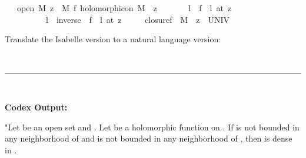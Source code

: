 \documentclass{article}
\begin{document}
\begin{boxB}
\begin{isabelle}
\isamarkupfalse \isanewline
\ \ \ {\isachardoublequoteopen}open\ M{\isachardoublequoteclose}\ {\isachardoublequoteopen}z\ {\isasymin}\ M{\isachardoublequoteclose}\ {\isachardoublequoteopen}f\ holomorphic{\isacharunderscore}{\kern0pt}on\ {\isacharparenleft}{\kern0pt}M\ {\isacharminus}{\kern0pt}\ {\isacharbraceleft}{\kern0pt}z{\isacharbraceright}{\kern0pt}{\isacharparenright}{\kern0pt}{\isachardoublequoteclose}\isanewline
\ \ \ \ \ \ \ {\isachardoublequoteopen}{\isasymAnd}l{\isachardot}{\kern0pt}\ {\isasymnot}\ {\isacharparenleft}{\kern0pt}f\ {\isasymlonglongrightarrow}\ l{\isacharparenright}{\kern0pt}\ {\isacharparenleft}{\kern0pt}at\ z{\isacharparenright}{\kern0pt}{\isachardoublequoteclose}\ \isanewline
\ \ \ \ \ \ \ \ \ \ {\isachardoublequoteopen}{\isasymAnd}l{\isachardot}{\kern0pt}\ {\isasymnot}\ {\isacharparenleft}{\kern0pt}{\isacharparenleft}{\kern0pt}inverse\ {\isasymcirc}\ f{\isacharparenright}{\kern0pt}\ {\isasymlonglongrightarrow}\ l{\isacharparenright}{\kern0pt}\ {\isacharparenleft}{\kern0pt}at\ z{\isacharparenright}{\kern0pt}{\isachardoublequoteclose}\isanewline
\ \ \ \ \ {\isachardoublequoteopen}closure{\isacharparenleft}{\kern0pt}f\ {\isacharbackquote}{\kern0pt}\ {\isacharparenleft}{\kern0pt}M\ {\isacharminus}{\kern0pt}\ {\isacharbraceleft}{\kern0pt}z{\isacharbraceright}{\kern0pt}{\isacharparenright}{\kern0pt}{\isacharparenright}{\kern0pt}\ {\isacharequal}{\kern0pt}\ UNIV{\isachardoublequoteclose}
\end{isabelle}
Translate the Isabelle version to a natural language version:

\
\hrule
\

\textbf{Codex Output:}

"Let  be an open set and . Let  be a holomorphic function on . If  is not bounded in any neighborhood of  and  is not bounded in any neighborhood of , then  is dense in . 
\end{boxB}
\end{document}
